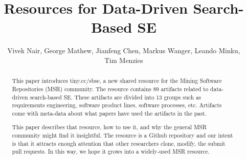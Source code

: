 \documentclass[table, xcdraw, sigconf,review, anonymous]{acmart}
\begin{document}
\title{
Resources for Data-Driven Search-Based SE}

\author{Vivek Nair, George Mathew, Jianfeng Chen, Markus Wanger, Leando Minku, Tim Menzies}
\email{}


\begin{abstract}
This paper introduces tiny.cc/sbse, a  new shared resource for the Mining Software
Repositories (MSR) community.
The resource contains 89
artifacts related to data-driven search-based SE.
These artifacts are divided into 13 groups
such as requirements engineering, software product lines, software processes, etc.
Artifacts come with   meta-data about what papers have used 
the artifacts   in the past.   




This paper describes that resource,    how to use it,
and why the general MSR community might find it insightful.
The resource is a Github repository and our intent is that it
attracts enough attention that  other researchers  clone, modify, the submit  pull requests. In this way, we hope it grows
into a widely-used MSR resource.
\end{abstract}

%
%
\end{document}
